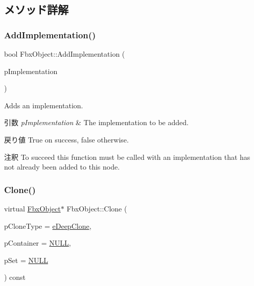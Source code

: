 \subsection{メソッド詳解}
\mbox{\label{class_fbx_object_a83138088781da53eb6fc3e3793ca9171}} 
\subsubsection{\texorpdfstring{Add\+Implementation()}{AddImplementation()}}
{\footnotesize\ttfamily bool Fbx\+Object\+::\+Add\+Implementation (\begin{DoxyParamCaption}\item[{\hyperlink{class_fbx_implementation}{Fbx\+Implementation} $\ast$}]{p\+Implementation }\end{DoxyParamCaption})}

Adds an implementation. 
\begin{DoxyParams}{引数}
{\em p\+Implementation} & The implementation to be added. \\
\hline
\end{DoxyParams}
\begin{DoxyReturn}{戻り値}
{\ttfamily True} on success, {\ttfamily false} otherwise. 
\end{DoxyReturn}
\begin{DoxyRemark}{注釈}
To succeed this function must be called with an implementation that has not already been added to this node. 
\end{DoxyRemark}
\mbox{\label{class_fbx_object_ad553a4262b09cb57c3171a93edadbab8}} 
\subsubsection{\texorpdfstring{Clone()}{Clone()}}
{\footnotesize\ttfamily virtual \hyperlink{class_fbx_object}{Fbx\+Object}$\ast$ Fbx\+Object\+::\+Clone (\begin{DoxyParamCaption}\item[{\hyperlink{class_fbx_object_a9f5626b2d2135684d6ea1e6e4ad2acbb}{Fbx\+Object\+::\+E\+Clone\+Type}}]{p\+Clone\+Type = {\ttfamily \hyperlink{class_fbx_object_a9f5626b2d2135684d6ea1e6e4ad2acbbaacdf137ca059c572798287e98c4236d0}{e\+Deep\+Clone}},  }\item[{\hyperlink{class_fbx_object}{Fbx\+Object} $\ast$}]{p\+Container = {\ttfamily \hyperlink{fbxarch_8h_a070d2ce7b6bb7e5c05602aa8c308d0c4}{N\+U\+LL}},  }\item[{void $\ast$}]{p\+Set = {\ttfamily \hyperlink{fbxarch_8h_a070d2ce7b6bb7e5c05602aa8c308d0c4}{N\+U\+LL}} }\end{DoxyParamCaption}) const\hspace{0.3cm}{\ttfamily [virtual]}}

